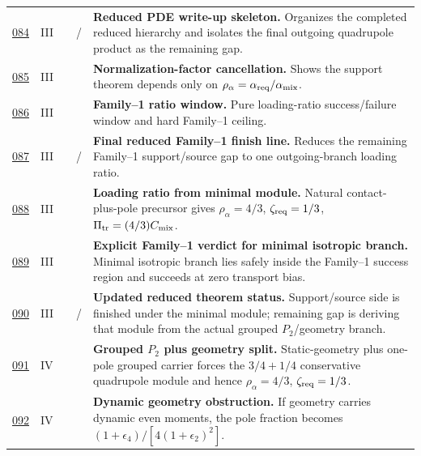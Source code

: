 {\begin{longtable}{@{}L{0.055\textwidth}L{0.075\textwidth}L{0.145\textwidth}L{0.235\textwidth}L{0.43\textwidth}@{}}
\addlinespace
\hyperref[stage:084]{084} & III &  & \StatusExactClosure{} / \StatusOpen{} & \textbf{Reduced PDE write-up skeleton.} Organizes the completed reduced hierarchy and isolates the final outgoing quadrupole product as the remaining gap. \\
\addlinespace
\hyperref[stage:085]{085} & III &  & \StatusExactClosure{} & \textbf{Normalization-factor cancellation.} Shows the support theorem depends only on \(\rho_\alpha=\alpha_{\rm req}/\alpha_{\rm mix}\). \\
\addlinespace
\hyperref[stage:086]{086} & III &  & \StatusExactClosure{} & \textbf{Family--1 ratio window.} Pure loading-ratio success/failure window and hard Family--1 ceiling. \\
\addlinespace
\hyperref[stage:087]{087} & III &  & \StatusExactClosure{} / \StatusOpen{} & \textbf{Final reduced Family--1 finish line.} Reduces the remaining Family--1 support/source gap to one outgoing-branch loading ratio. \\
\addlinespace
\hyperref[stage:088]{088} & III &  & \StatusExactClosure{} & \textbf{Loading ratio from minimal module.} Natural contact-plus-pole precursor gives \(\rho_\alpha=4/3\), \(\zeta_{\rm req}=1/3\), \(\Pi_{\rm tr}=(4/3)C_{\rm mix}\). \\
\addlinespace
\hyperref[stage:089]{089} & III &  & \StatusExactClosure{} & \textbf{Explicit Family--1 verdict for minimal isotropic branch.} Minimal isotropic branch lies safely inside the Family--1 success region and succeeds at zero transport bias. \\
\addlinespace
\hyperref[stage:090]{090} & III &  & \StatusOpen{} / \StatusExactClosure{} & \textbf{Updated reduced theorem status.} Support/source side is finished under the minimal module; remaining gap is deriving that module from the actual grouped \(P_2\)/geometry branch. \\
\addlinespace
\hyperref[stage:091]{091} & IV &  & \StatusExactClosure{} & \textbf{Grouped \(P_2\) plus geometry split.} Static-geometry plus one-pole grouped carrier forces the \(3/4+1/4\) conservative quadrupole module and hence \(\rho_\alpha=4/3\), \(\zeta_{\rm req}=1/3\). \\
\addlinespace
\hyperref[stage:092]{092} & IV &  & \StatusExactClosure{} & \textbf{Dynamic geometry obstruction.} If geometry carries dynamic even moments, the pole fraction becomes \((1+\epsilon_4)/[4(1+\epsilon_2)^2]\). \\

\end{longtable}}

